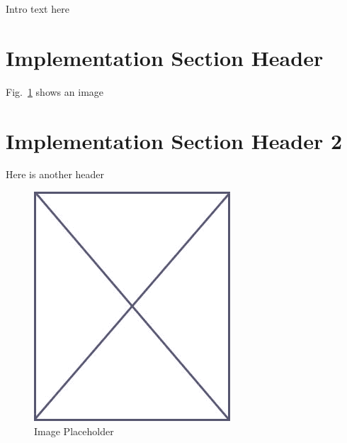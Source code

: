 Intro text here

\section{Implementation Section Header}
\label{imp_sec_1}

Fig.~\ref{fig:placeholder_imp} shows an image

\section{Implementation Section Header 2}
\label{imp_sec_2}

Here is another header


\begin{figure}
\begin{center}
\vspace{-32pt}
\includegraphics[scale=.45]{figs/placeholder}
\end{center}
\vspace{-12pt}
\caption{Image Placeholder}
\label{fig:placeholder_imp}
\end{figure}
